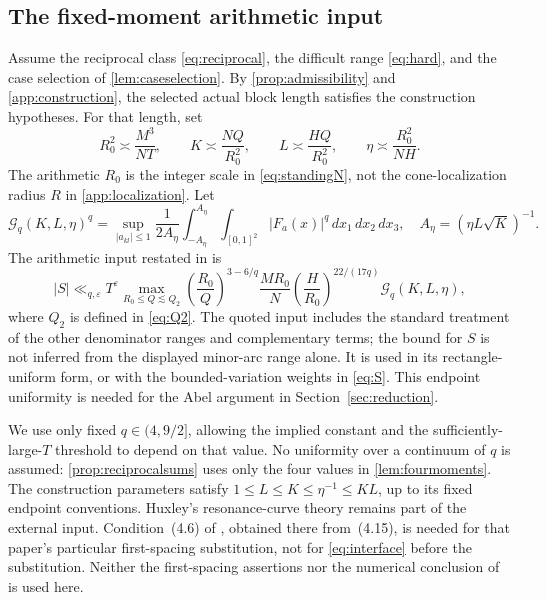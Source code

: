 \documentclass[11pt,reqno]{amsart}
\numberwithin{equation}{section}
\theoremstyle{definition}
\theoremstyle{remark}
\newcommand{\eps}{\varepsilon}
\newcommand{\Gq}{\mathcal G_q}
\begin{document}
\subsection{The fixed-moment arithmetic input}
Assume the reciprocal class \eqref{eq:reciprocal}, the difficult range \eqref{eq:hard}, and the case selection of \cref{lem:caseselection}.
By \cref{prop:admissibility} and \cref{app:construction}, the selected actual block length satisfies the construction hypotheses.
For that length, set
\begin{equation}\label{eq:arithmeticparameters}
 R_0^2\asymp\frac{M^3}{NT},\qquad
 K\asymp\frac{NQ}{R_0^2},\qquad
 L\asymp\frac{HQ}{R_0^2},\qquad
 \eta\asymp\frac{R_0^2}{NH}.
\end{equation}
The arithmetic $R_0$ is the integer scale in \eqref{eq:standingN}, not the cone-localization radius $R$ in \cref{app:localization}.
Let
\begin{equation}\label{eq:Geta}
 \Gq(K,L,\eta)^q=
 \sup_{|a_{kl}|\le1}\frac1{2A_\eta}
 \int_{-A_\eta}^{A_\eta}\int_{[0,1]^2}|F_a(x)|^q\,dx_1\,dx_2\,dx_3,
 \quad A_\eta=(\eta L\sqrt K)^{-1}.
\end{equation}
The arithmetic input restated in \cite[Lemma~4.4, equations~(4.8) and~(4.12)]{LY} is
\begin{equation}\label{eq:interface}
 |S|\ll_{q,\eps}T^\eps
 \max_{R_0\le Q\lesssim Q_2}
 \left(\frac{R_0}{Q}\right)^{3-6/q}
 \frac{MR_0}{N}\left(\frac H{R_0}\right)^{22/(17q)}
 \Gq(K,L,\eta),
\end{equation}
where $Q_2$ is defined in \eqref{eq:Q2}.
The quoted input includes the standard treatment of the other denominator ranges and complementary terms; the bound for $S$ is not inferred from the displayed minor-arc range alone.
It is used in its rectangle-uniform form, or with the bounded-variation weights in \eqref{eq:S}. This endpoint uniformity is needed for the Abel argument in Section~\ref{sec:reduction}.

We use only fixed $q\in(4,9/2]$, allowing the implied constant and the sufficiently-large-$T$ threshold to depend on that value.
No uniformity over a continuum of $q$ is assumed: \cref{prop:reciprocalsums} uses only the four values in \cref{lem:fourmoments}.
The construction parameters satisfy $1\le L\le K\le\eta^{-1}\le KL$, up to its fixed endpoint conventions.
Huxley's resonance-curve theory remains part of the external input.
Condition~(4.6) of \cite{LY}, obtained there from~(4.15), is needed for that paper's particular first-spacing substitution, not for \eqref{eq:interface} before the substitution.
Neither the first-spacing assertions nor the numerical conclusion of \cite{BW17} is used here.
\end{document}
